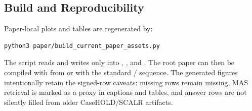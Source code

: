 \subsection{Build and Reproducibility}

Paper-local plots and tables are regenerated by:

\begin{verbatim}
python3 paper/build_current_paper_assets.py
\end{verbatim}

The script reads \claimgate and writes only into ,
, and . The root
paper can then be compiled with  from
 or with the standard /
sequence. The generated figures intentionally retain the signed-row caveats:
missing rows remain missing, MAS retrieval is marked as a proxy in captions and
tables, and answer rows are not silently filled from older CaseHOLD/SCALR
artifacts.
